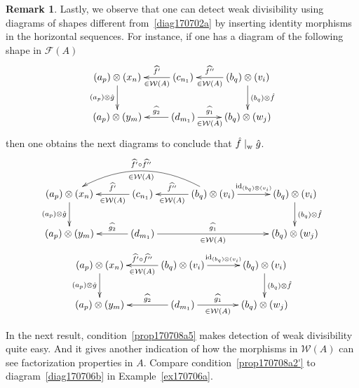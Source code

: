 \documentclass[reqno]{amsart}
\theoremstyle{plain}
\theoremstyle{definition}
\newtheorem{disc}[lem]{Remark}
\newcommand{\cat}[1]{\mathcal{#1}}
\newcommand{\catw}{\cat{W}}
\newcommand{\catf}{\cat{F}}
\newcommand{\id}{\operatorname{id}}
\numberwithin{equation}{lem}
\newcommand{\divs}{\mid_{\text w}^{}}
\begin{document}
\begin{disc}
Lastly, we observe that one can detect weak divisibility using diagrams of shapes different
from~\eqref{diag170702a} by inserting identity morphisms in the horizontal sequences.
For instance, if one has a diagram of the following shape in $\catf(A)$
$$\xymatrix{
(a_p)\otimes(x_n)\ar[d]_-{(a_p)\otimes\hat g}
&\ar[l]_-{\widehat{f'}}^-{\in\catw(A)}(c_{n_1})
&\ar[l]_-{\widehat{f''}}^-{\in\catw(A)}(b_q)\otimes(v_i)\ar[d]^-{(b_q)\otimes\hat f}
\\
(a_p)\otimes(y_m)
&\ar[l]_-{\widehat{g_{2}}}(d_{m_{1}})\ar[r]^-{\widehat{g_{1}}}_-{\in\catw(A)}
&(b_q)\otimes(w_j)
}$$
then one obtains the next 
diagrams
to conclude that $\hat f\divs\hat g$.
\begin{gather*}
\xymatrix@C=11mm{
(a_p)\otimes(x_n)\ar[d]_-{(a_p)\otimes\hat g}
&\ar[l]_-{\widehat{f'}}^-{\in\catw(A)}(c_{n_1})
&\ar[l]_-{\widehat{f''}}^-{\in\catw(A)}(b_q)\otimes(v_i)\ar[r]^-{\id_{(b_q)\otimes(v_i)}}\ar@/_2pc/[ll]_-{\widehat{f'}\circ\widehat{f''}}^-{\in\catw(A)}
&(b_q)\otimes(v_i)\ar[d]^-{(b_q)\otimes\hat f}
\\
(a_p)\otimes(y_m)
&\ar[l]_-{\widehat{g_{2}}}(d_{m_{1}})\ar[rr]^-{\widehat{g_{1}}}_-{\in\catw(A)}
&&(b_q)\otimes(w_j)}\\
\xymatrix@C=11mm{
(a_p)\otimes(x_n)\ar[d]_-{(a_p)\otimes\hat g}
&\ar[l]_-{\widehat{f'}\circ\widehat{f''}}^-{\in\catw(A)}(b_q)\otimes(v_i)\ar[r]^-{\id_{(b_q)\otimes(v_i)}}
&(b_q)\otimes(v_i)\ar[d]^-{(b_q)\otimes\hat f}
\\
(a_p)\otimes(y_m)
&\ar[l]_-{\widehat{g_{2}}}(d_{m_{1}})\ar[r]^-{\widehat{g_{1}}}_-{\in\catw(A)}
&(b_q)\otimes(w_j)
}
\end{gather*}
\end{disc}

In the next result, 
condition~\eqref{prop170708a5}  makes detection of weak divisibility quite easy.
And it gives another indication of how the morphisms in $\catw(A)$ can see factorization properties in $A$.
Compare condition~\eqref{prop170708a2'}  to 
diagram~\eqref{diag170706b}
in 
Example~\ref{ex170706a}.
\end{document}
